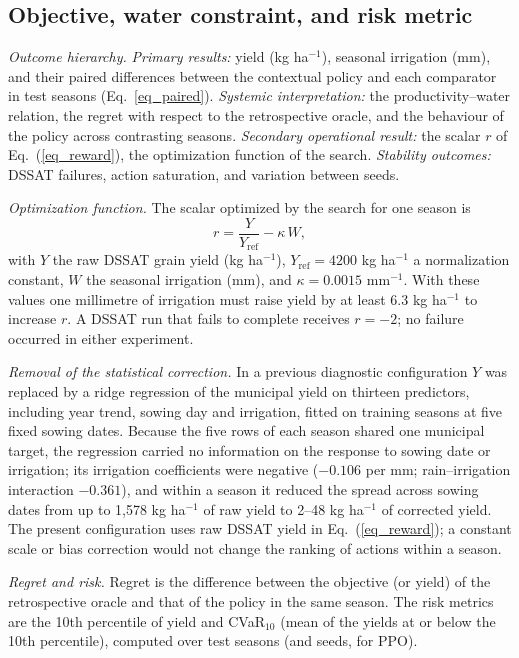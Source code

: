 \documentclass[times,final,authoryear]{elsarticle}
\begin{document}
\subsection{Objective, water constraint, and risk metric}
\label{subobjective}

\emph{Outcome hierarchy.} \emph{Primary results:} yield (kg ha$^{-1}$), seasonal irrigation (mm), and their paired differences between the contextual policy and each comparator in test seasons (Eq.~\ref{eq_paired}). \emph{Systemic interpretation:} the productivity--water relation, the regret with respect to the retrospective oracle, and the behaviour of the policy across contrasting seasons. \emph{Secondary operational result:} the scalar $r$ of Eq.~(\ref{eq_reward}), the optimization function of the search. \emph{Stability outcomes:} DSSAT failures, action saturation, and variation between seeds.

\emph{Optimization function.} The scalar optimized by the search for one season is
\begin{equation}
r = \frac{Y}{Y_{\text{ref}}} - \kappa\, W,
\label{eq_reward}
\end{equation}
with $Y$ the raw DSSAT grain yield (kg ha$^{-1}$), $Y_{\text{ref}} = 4200$ kg ha$^{-1}$ a normalization constant, $W$ the seasonal irrigation (mm), and $\kappa = 0.0015$ mm$^{-1}$. With these values one millimetre of irrigation must raise yield by at least 6.3 kg ha$^{-1}$ to increase $r$. A DSSAT run that fails to complete receives $r = -2$; no failure occurred in either experiment.

\emph{Removal of the statistical correction.} In a previous diagnostic configuration $Y$ was replaced by a ridge regression of the municipal yield on thirteen predictors, including year trend, sowing day and irrigation, fitted on training seasons at five fixed sowing dates. Because the five rows of each season shared one municipal target, the regression carried no information on the response to sowing date or irrigation; its irrigation coefficients were negative ($-0.106$ per mm; rain--irrigation interaction $-0.361$), and within a season it reduced the spread across sowing dates from up to 1,578 kg ha$^{-1}$ of raw yield to 2--48 kg ha$^{-1}$ of corrected yield. The present configuration uses raw DSSAT yield in Eq.~(\ref{eq_reward}); a constant scale or bias correction would not change the ranking of actions within a season.

\emph{Regret and risk.} Regret is the difference between the objective (or yield) of the retrospective oracle and that of the policy in the same season. The risk metrics are the 10th percentile of yield and CVaR$_{10}$ (mean of the yields at or below the 10th percentile), computed over test seasons (and seeds, for PPO).
\end{document}
